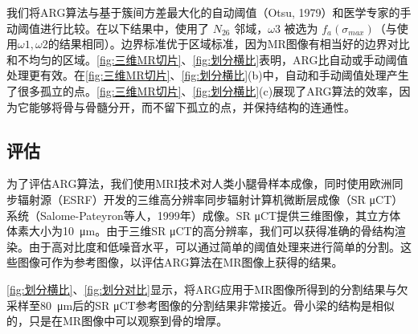我们将ARG算法与基于簇间方差最大化的自动阈值（Otsu, 1979\cite{otsu1979threshold}）和医学专家的手动阈值进行比较。在以下结果中，使用了 $N_{26}$ 邻域，$\omega3$ 被选为 $f_{a}(\sigma_{max})$（与使用$\omega1, \omega2$的结果相同）。边界标准优于区域标准，因为MR图像有相当好的边界对比和不均匀的区域。\cref{fig:三维MR切片}、\cref{fig:划分横比}表明，ARG比自动或手动阈值处理更有效。在\cref{fig:三维MR切片}、\cref{fig:划分横比}(b)中，自动和手动阈值处理产生了很多孤立的点。\cref{fig:三维MR切片}、\cref{fig:划分横比}(c)展现了ARG算法的效率，因为它能够将骨与骨髓分开，而不留下孤立的点，并保持结构的连通性。

\subsection{评估}

为了评估ARG算法，我们使用MRI技术对人类小腿骨样本成像，同时使用欧洲同步辐射源（ESRF）开发的三维高分辨率同步辐射计算机微断层成像（SR μCT）系统（Salome-Pateyron等人，1999年\cite{salome1999synchrotron}）成像。SR μCT提供三维图像，其立方体体素大小为\SI{10}{\micro\meter}。由于三维SR μCT的高分辨率，我们可以获得准确的骨结构渲染。由于高对比度和低噪音水平，可以通过简单的阈值处理来进行简单的分割。这些图像可作为参考图像，以评估ARG算法在MR图像上获得的结果。

\cref{fig:划分横比}、\cref{fig:划分对比}显示，将ARG应用于MR图像所得到的分割结果与欠采样至\SI{80}{\micro\meter}后的SR μCT参考图像的分割结果非常接近。骨小梁的结构是相似的，只是在MR图像中可以观察到骨的增厚。

